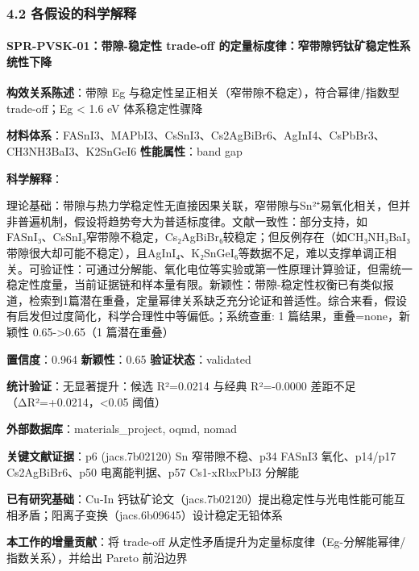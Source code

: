 \documentclass[12pt,a4paper]{ctexart}
\begin{document}
\subsubsection{4.2 各假设的科学解释}\label{ux5404ux5047ux8bbeux7684ux79d1ux5b66ux89e3ux91ca-2}

\paragraph{SPR-PVSK-01：带隙-稳定性 trade-off 的定量标度律：窄带隙钙钛矿稳定性系统性下降}\label{spr-pvsk-01ux5e26ux9699-ux7a33ux5b9aux6027-trade-off-ux7684ux5b9aux91cfux6807ux5ea6ux5f8bux7a84ux5e26ux9699ux9499ux949bux77ffux7a33ux5b9aux6027ux7cfbux7edfux6027ux4e0bux964d}

\textbf{构效关系陈述}：带隙 Eg 与稳定性呈正相关（窄带隙不稳定），符合幂律/指数型 trade-off；Eg \textless{} 1.6 eV 体系稳定性骤降

\textbf{材料体系}：FASnI3、MAPbI3、CsSnI3、Cs2AgBiBr6、AgInI4、CsPbBr3、CH3NH3BaI3、K2SnGeI6 \textbar{} \textbf{性能属性}：band gap

\textbf{科学解释}：

理论基础：带隙与热力学稳定性无直接因果关联，窄带隙与Sn²⁺易氧化相关，但并非普遍机制，假设将趋势夸大为普适标度律。文献一致性：部分支持，如FASnI₃、CsSnI₃窄带隙不稳定，Cs₂AgBiBr₆较稳定；但反例存在（如CH₃NH₃BaI₃带隙很大却可能不稳定），且AgInI₄、K₂SnGeI₆等数据不足，难以支撑单调正相关。可验证性：可通过分解能、氧化电位等实验或第一性原理计算验证，但需统一稳定性度量，当前证据链和样本量有限。新颖性：带隙-稳定性权衡已有类似报道，检索到1篇潜在重叠，定量幂律关系缺乏充分论证和普适性。综合来看，假设有启发但过度简化，科学合理性中等偏低。；系统查重: 1 篇结果，重叠=none，新颖性 0.65-\textgreater0.65（1 篇潜在重叠）

\textbf{置信度}：0.964 \textbar{} \textbf{新颖性}：0.65 \textbar{} \textbf{验证状态}：validated

\textbf{统计验证}：无显著提升：候选 R²=0.0214 与经典 R²=-0.0000 差距不足（ΔR²=+0.0214，\textless0.05 阈值）

\textbf{外部数据库}：materials\_project, oqmd, nomad

\textbf{关键文献证据}：p6 (jacs.7b02120) Sn 窄带隙不稳、p34 FASnI3 氧化、p14/p17 Cs2AgBiBr6、p50 电离能判据、p57 Cs1-xRbxPbI3 分解能

\textbf{已有研究基础}：Cu-In 钙钛矿论文（jacs.7b02120）提出稳定性与光电性能可能互相矛盾；阳离子变换（jacs.6b09645）设计稳定无铅体系

\textbf{本工作的增量贡献}：将 trade-off 从定性矛盾提升为定量标度律（Eg-分解能幂律/指数关系），并给出 Pareto 前沿边界
\end{document}
